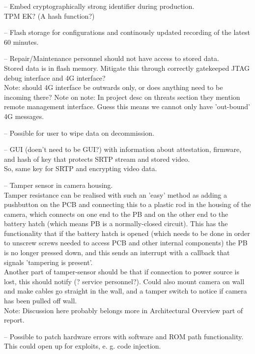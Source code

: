 \documentclass[10pt]{article}
\newenvironment{checklist}{%
  \begin{list}{}{}%
  \let\olditem\item
  \renewcommand\item{\olditem -- \marginpar{$\Box$} }
  \newcommand\checkeditem{\olditem -- \marginpar{$\CheckedBox$} }
}{%
  \end{list}
}
\begin{document}
\begin{checklist}
{      }
      \item{Embed cryptographically strong identifier during production. \\
	TPM EK? (A hash function?)}
      \item{Flash storage for configurations and continously updated recording of the latest 60 minutes.} %
      \item{Repair/Maintenance personnel should not have access to stored data. \\
	Stored data is in flash memory. Mitigate this through correctly gatekeeped JTAG debug interface and 4G interface? \\
	Note: should 4G interface be outwards only, or does anything need to be incoming there? 
	Note on note: In project desc on threats section they mention remote management interface. Guess this means we cannot only have 'out-bound' 4G messages.}
      \item{Possible for user to wipe data on decommission.}
      \item{GUI (doen't need to be GUI?) with information about attestation, firmware, and hash of key
        that protects SRTP stream and stored video.\\
	So, same key for SRTP and encrypting video data.}
      \item{Tamper sensor in camera housing. \\
	Tamper resistance can be realised with such an 'easy' method as adding a pushbutton on the PCB and connecting this to a plastic rod in the housing of the camera,
	which connects on one end to the PB and on the other end to the battery hatch (which means PB is a normally-closed circuit). This has the functionality that if 
	the battery hatch is opened (which needs to be done in order to unscrew screws needed to access PCB and other internal components) 
	the PB is no longer pressed down, and this sends an interrupt with a callback that signals 'tampering is present'. \\
	Another part of tamper-sensor should be that if connection to power source is lost, this should notify (? service personnel?). 
	Could also mount camera on wall and make cables go straight in the wall, and a tamper switch to notice if camera has been pulled off wall.\\
	Note: Discussion here probably belongs more in Architectural Overview part of report.}
      \item{Possible to patch hardware errors with software and ROM path
        functionality. \\
	This could open up for exploits, e. g. code injection.
	}
    \end{checklist}
\end{document}
